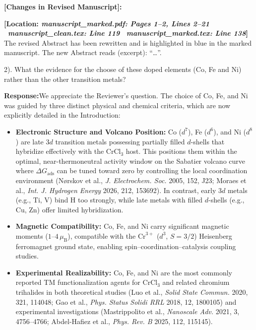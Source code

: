 \documentclass[11pt, sans, a4paper]{moderncv}
\newcommand{\response}{\vspace{0.4em}\noindent\textbf{\color{actionblue}Response:}\hspace{0.5em}}
\newcommand{\manuscriptchange}[1]{\vspace{0.4em}\noindent\textbf{\color{acsblue}[Changes in Revised Manuscript]:}\par\nopagebreak\vspace{0.15em}#1\vspace{0.4em}}
\begin{document}
\manuscriptchange{\textbf{[Location: \textit{manuscript\_marked.pdf: Pages 1--2, Lines 2--21} \textbar\ \textit{manuscript\_clean.tex: Line 119} \textbar\ \textit{manuscript\_marked.tex: Line 138}]}\\ The revised Abstract has been rewritten and is highlighted in blue in the marked manuscript. The new Abstract reads (excerpt): ``\dots{\itshape \ExecuteMetaData[manuscript_marked.tex]{AbstractTradeoff}}''.}

\vspace{0.8em}

\begin{reviewercomment}
2). What the evidence for the choose of these doped elements (Co, Fe and Ni) rather than the other transition metals?
\end{reviewercomment}

\response We appreciate the Reviewer's question. The choice of Co, Fe, and Ni was guided by three distinct physical and chemical criteria, which are now explicitly detailed in the Introduction:
\begin{itemize}[leftmargin=1.5em, itemsep=0.2em]
\item \textbf{Electronic Structure and Volcano Position:} Co ($d^7$), Fe ($d^6$), and Ni ($d^8$) are late $3d$ transition metals possessing partially filled $d$-shells that hybridize effectively with the $\text{CrCl}_3$ host. This positions them within the optimal, near-thermoneutral activity window on the Sabatier volcano curve where $\Delta G_{\mathrm{ads}}$ can be tuned toward zero by controlling the local coordination environment (N{\o}rskov et al., \textit{J. Electrochem. Soc.} 2005, 152, J23; Moraes et al., \textit{Int. J. Hydrogen Energy} 2026, 212, 153692). In contrast, early $3d$ metals (e.g., Ti, V) bind H too strongly, while late metals with filled $d$-shells (e.g., Cu, Zn) offer limited hybridization.
\item \textbf{Magnetic Compatibility:} Co, Fe, and Ni carry significant magnetic moments ($1\text{--}4\,\mu_{\mathrm{B}}$), compatible with the $\text{Cr}^{3+}$ ($d^3$, $S=3/2$) Heisenberg ferromagnet ground state, enabling spin--coordination--catalysis coupling studies.
\item \textbf{Experimental Realizability:} Co, Fe, and Ni are the most commonly reported TM functionalization agents for $\text{CrCl}_3$ and related chromium trihalides in both theoretical studies (Luo et al., \textit{Solid State Commun.} 2020, 321, 114048; Gao et al., \textit{Phys. Status Solidi RRL} 2018, 12, 1800105) and experimental investigations (Mastrippolito et al., \textit{Nanoscale Adv.} 2021, 3, 4756--4766; Abdel-Hafiez et al., \textit{Phys. Rev. B} 2025, 112, 115145).
\end{itemize}
\end{document}
